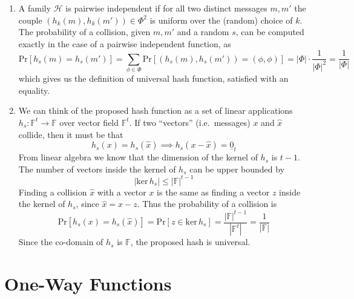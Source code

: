 \documentclass{article}
\newcommand{\hash}{\mathcal{H}}
\newcommand{\field}{\mathbb{F}}
\newcommand{\zero}{\underline{0}}
\renewcommand{\ker}{\ensuremath{\mathrm{ker}\,}}
\renewcommand{\Pr}[1]{\ensuremath{\mathrm{Pr} \left[ {#1} \right]}}
\newcommand{\abs}[1]{\left| {#1} \right|}
\begin{document}
\begin{enumerate}
	\item A family $\hash$ is pairwise independent if for all two distinct messages $m, m'$ the couple $(h_k(m), h_k(m')) \in \Phi^2$ is uniform over the (random) choice of $k$.
		The probability of a collision, given $m, m'$ and a random $s$, can be computed exactly in the case of a pairwise independent function, as
		\[
			\Pr{h_s(m) = h_s(m')} = \sum_{\phi \in \Phi} \Pr{(h_s(m), h_s(m')) = (\phi, \phi)} =
			\abs{\Phi} \cdot \frac{1}{\abs{\Phi}^2} = \frac{1}{\abs{\Phi}}
		\]
		which gives us the definition of universal hash function, satisfied with an equality.

	\item We can think of the proposed hash function as a set of linear applications $h_s : \field^t \to \field$ over vector field $\field^t$.
		If two ``vectors'' (i.e.\ messages) $x$ and $\hat{x}$ collide, then it must be that
		\[
			h_s(x) = h_s(\hat{x}) \implies h_s(x - \hat{x}) = \zero_t
		\]
		From linear algebra we know that the dimension of the kernel of $h_s$ is $t-1$.
		The number of vectors inside the kernel of $h_s$ can be upper bounded by
		\[
			\abs{\ker h_s} \le \abs{\field}^{t-1}
		\]
		Finding a collision $\hat{x}$ with a vector $x$ is the same as finding a vector $z$ inside the kernel of $h_s$, since $\hat{x} = x - z$.
		Thus the probability of a collision is
		\[
			\Pr{h_s(x) = h_s(\hat{x})} =
			\Pr{z \in \ker h_s} =
			\frac{\abs{\field}^{t-1}}{\abs{\field^{t}}} =
			\frac{1}{\abs{\field}}
		\]
		Since the co-domain of $h_s$ is $\field$, the proposed hash is universal.
\end{enumerate}

\section{One-Way Functions}
\end{document}
